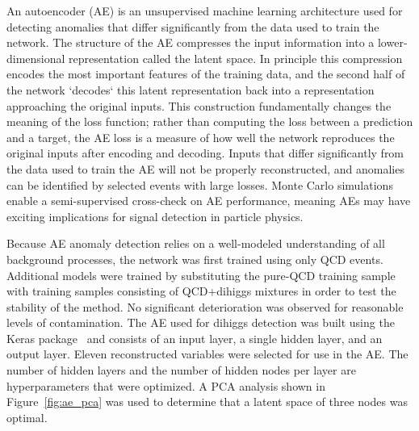 \label{sec:AE}

An autoencoder (AE) is an unsupervised machine learning architecture used for detecting anomalies that differ significantly from the data used to train the network. The structure of the AE compresses the input information into a lower-dimensional representation called the latent space. In principle this compression encodes the most important features of the training data, and the second half of the network `decodes` this latent representation back into a representation approaching the original inputs. This construction fundamentally changes the meaning of the loss function; rather than computing the loss between a prediction and a target, the AE loss is a measure of how well the network reproduces the original inputs after encoding and decoding. Inputs that differ significantly from the data used to train the AE will not be properly reconstructed, and anomalies can be identified by selected events with large losses. Monte Carlo simulations enable a semi-supervised cross-check on AE performance, meaning AEs may have exciting implications for signal detection in particle physics.

Because AE anomaly detection relies on a well-modeled understanding of all background processes, the network was first trained using only QCD events. Additional models were trained by substituting the pure-QCD training sample with training samples consisting of QCD+dihiggs mixtures in order to test the stability of the method. No significant deterioration was observed for reasonable levels of contamination. The AE used for dihiggs detection was built using the Keras package~\cite{chollet2015keras} and consists of an input layer, a single hidden layer, and an output layer. Eleven reconstructed variables were selected for use in the AE. The number of hidden layers and the number of hidden nodes per layer are hyperparameters that were optimized. A PCA analysis shown in Figure~\ref{fig:ae_pca} was used to determine that a latent space of three nodes was optimal.

